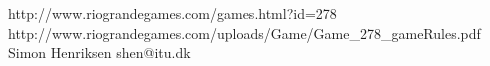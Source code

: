\documentclass[12pt,a4paper,notitlepage]{article}
\begin{document}
\pagebreak

\pagebreak

\pagebreak





\begin{thebibliography}{9}
 http://www.riograndegames.com/games.html?id=278
 http://www.riograndegames.com/uploads/Game/Game\_278\_gameRules.pdf
 Simon Henriksen shen{\makeatletter @\makeatother}itu.dk
\end{thebibliography}
\end{document}
